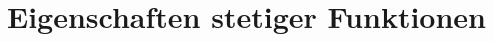 \documentclass[main.tex]{subfiles}
\begin{document}
\section*{Eigenschaften stetiger Funktionen}
\begin{karte}{}

\end{karte}
\begin{karte}{}

\end{karte}
\begin{karte}{}

\end{karte}
\begin{karte}{}

\end{karte}
\begin{karte}{}

\end{karte}
\begin{karte}{}

\end{karte}
\begin{karte}{}

\end{karte}
\begin{karte}{}

\end{karte}
\end{document}
